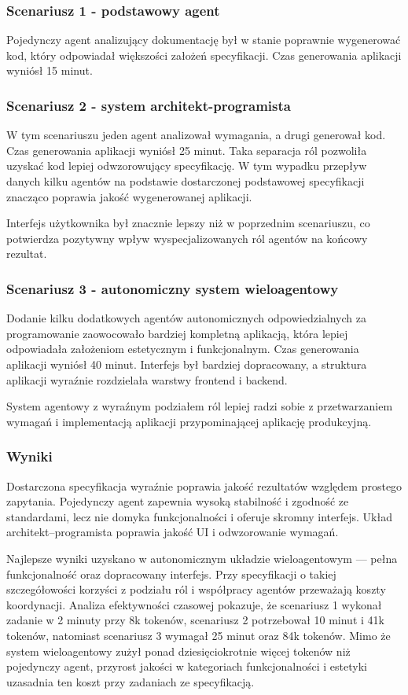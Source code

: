\subsubsection*{Scenariusz 1 - podstawowy agent}
Pojedynczy agent analizujący dokumentację był w stanie poprawnie wygenerować kod, który odpowiadał większości założeń specyfikacji. Czas generowania aplikacji wyniósł 15 minut.

\subsubsection*{Scenariusz 2 - system architekt-programista}
W tym scenariuszu jeden agent analizował wymagania, a drugi generował kod. Czas generowania aplikacji wyniósł 25 minut. Taka separacja ról pozwoliła uzyskać kod lepiej odwzorowujący specyfikację. W tym wypadku przepływ danych kilku agentów na podstawie dostarczonej podstawowej specyfikacji znacząco poprawia jakość wygenerowanej aplikacji.

Interfejs użytkownika był znacznie lepszy niż w poprzednim scenariuszu, co potwierdza pozytywny wpływ wyspecjalizowanych ról agentów na końcowy rezultat.

\subsubsection*{Scenariusz 3 - autonomiczny system wieloagentowy}
Dodanie kilku dodatkowych agentów autonomicznych odpowiedzialnych za programowanie zaowocowało bardziej kompletną aplikacją, która lepiej odpowiadała założeniom estetycznym i funkcjonalnym. Czas generowania aplikacji wyniósł 40 minut. Interfejs był bardziej dopracowany, a struktura aplikacji wyraźnie rozdzielała warstwy frontend i backend.

System agentowy z wyraźnym podziałem ról lepiej radzi sobie z przetwarzaniem wymagań i implementacją aplikacji przypominającej aplikację produkcyjną.

\subsubsection*{Wyniki}
Dostarczona specyfikacja wyraźnie poprawia jakość rezultatów względem prostego zapytania. Pojedynczy agent zapewnia wysoką stabilność i zgodność ze standardami, lecz nie domyka funkcjonalności i oferuje skromny interfejs. Układ architekt–programista poprawia jakość UI i odwzorowanie wymagań.

Najlepsze wyniki uzyskano w autonomicznym układzie wieloagentowym — pełna funkcjonalność oraz dopracowany interfejs. Przy specyfikacji o takiej szczegółowości korzyści z podziału ról i współpracy agentów przeważają koszty koordynacji. Analiza efektywności czasowej pokazuje, że scenariusz 1 wykonał zadanie w 2 minuty przy 8k tokenów, scenariusz 2 potrzebował 10 minut i 41k tokenów, natomiast scenariusz 3 wymagał 25 minut oraz 84k tokenów. Mimo że system wieloagentowy zużył ponad dziesięciokrotnie więcej tokenów niż pojedynczy agent, przyrost jakości w kategoriach funkcjonalności i estetyki uzasadnia ten koszt przy zadaniach ze specyfikacją.

